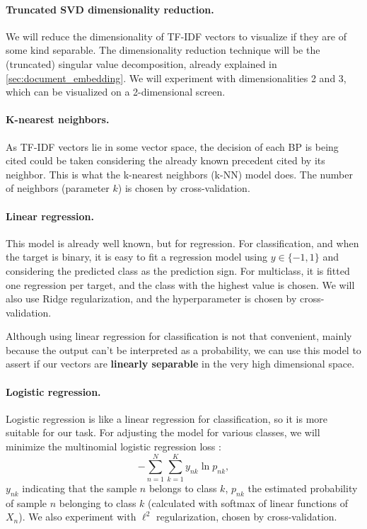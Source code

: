\documentclass[twocolumn]{article}
\begin{document}
                  \paragraph{Truncated SVD dimensionality reduction.} We will reduce the dimensionality of TF-IDF vectors to visualize if they are of some kind separable. The dimensionality reduction technique will be the (truncated) singular value decomposition, already explained in \autoref{sec:document_embedding}. We will experiment with dimensionalities 2 and 3, which can be visualized on a 2-dimensional screen.

                  \paragraph{K-nearest neighbors.} As TF-IDF vectors lie in some vector space, the decision of each BP is being cited could be taken considering the already known precedent cited by its neighbor. This is what the k-nearest neighbors (k-NN) model does. The number of neighbors (parameter $k$) is chosen by cross-validation.

                  \paragraph{Linear regression.} This model is already well known, but for regression. For classification, and when the target is binary, it is easy to fit a regression model using $y \in \{-1, 1\}$ and considering the predicted class as the prediction sign. For multiclass, it is fitted one regression per target, and the class with the highest value is chosen. We will also use Ridge regularization, and the hyperparameter is chosen by cross-validation.

                  Although using linear regression for classification is not that convenient, mainly because the output can't be interpreted as a probability, we can use this model to assert if our vectors are \textbf{linearly separable} in the very high dimensional space.

                  \paragraph{Logistic regression.} Logistic regression is like a linear regression for classification, so it is more suitable for our task. For adjusting the model for various classes, we will minimize the multinomial logistic regression loss \cite{bishop2006pattern}:
                  \[- \sum_{n=1}^N \sum_{k=1}^K y_{nk} \ln p_{nk},\]                  
                  $y_{nk}$ indicating that the sample $n$ belongs to class $k$, $p_{nk}$ the estimated probability of sample $n$ belonging to class $k$ (calculated with softmax of linear functions of $X_n$). We also experiment with $\ell^2$ regularization, chosen by cross-validation.
\end{document}
